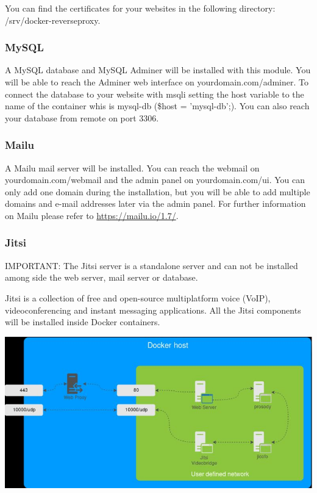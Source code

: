 \documentclass[a4paper,10pt]{scrartcl}
\begin{document}
\noindent You can find the certificates for your websites in the following directory: /srv/docker-reverseproxy.

\subsubsection{MySQL}

A MySQL database and MySQL Adminer will be installed with this module. You will be able to reach the Adminer web interface on yourdomain.com/adminer. To connect the database to your website with msqli setting the host variable to the name of the container whis is mysql-db (\$host = 'mysql-db';). You can also reach your database from remote on port 3306.

\subsubsection{Mailu}

A Mailu mail server will be installed. You can reach the webmail on yourdomain.com/webmail and the admin panel on yourdomain.com/ui. You can only add one domain during the installation, but you will be able to add multiple domains and e-mail addresses later via the admin panel. For further information on Mailu please refer to \url{https://mailu.io/1.7/}.

\subsubsection{Jitsi}

IMPORTANT: The Jitsi server is a standalone server and can not be installed among side the web server, mail server or database. \newline 

\noindent Jitsi is a collection of free and open-source multiplatform voice (VoIP), videoconferencing and instant messaging applications. All the Jitsi components will be installed inside Docker containers. \newline

\includegraphics[width=\textwidth]{jitsi} \newline
\end{document}
